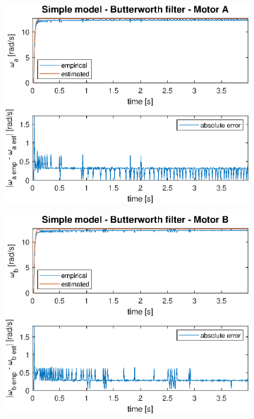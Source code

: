 \documentclass[a4paper,kul]{kulakarticle} %
\begin{document}
\begin{figure}[htp!]
\begin{subfigure}[b]{0.48\textwidth}
		\centering
		\includegraphics[width=\linewidth]{step_response_simple_BW_a.eps}
	\end{subfigure}
	\hfill
	\begin{subfigure}[b]{0.48\textwidth}
		\centering
		\includegraphics[width=\linewidth]{step_response_simple_BW_b.eps}
	\end{subfigure}
	\par\bigskip
	\begin{subfigure}[b]{0.48\textwidth}
		\centering

\end{subfigure}
\end{figure}
\end{document}
